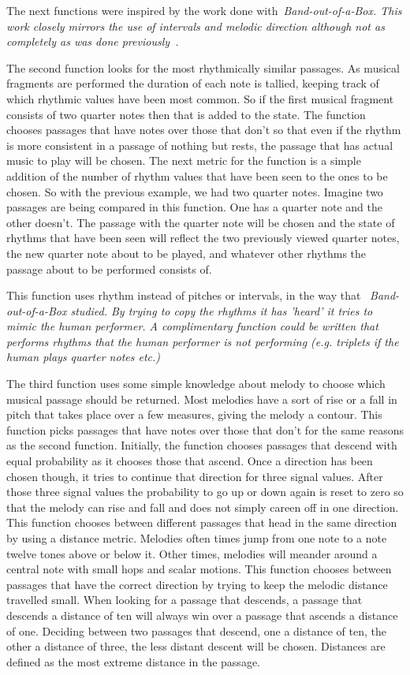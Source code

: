 \documentclass[12pt]{ucthesis}
\begin{document}
The next functions were inspired by the work done with~\em{Band-out-of-a-Box. }\em This work closely mirrors the use of intervals and melodic direction although not as completely as was done previously~\cite{bob}.

The second function looks for the most rhythmically similar passages. As musical fragments are performed the duration of each note is tallied, keeping track of which rhythmic values have been most common. So if the first musical fragment consists of two quarter notes then that is added to the state. The function chooses passages that have notes over those that don't so that even if the rhythm is more consistent in a passage of nothing but rests, the passage that has actual music to play will be chosen. The next metric for the function is a simple addition of the number of rhythm values that have been seen to the ones to be chosen. So with the previous example, we had two quarter notes. Imagine two passages are being compared in this function. One has a quarter note and the other doesn't. The passage with the quarter note will be chosen and the state of rhythms that have been seen will reflect the two previously viewed quarter notes, the new quarter note about to be played, and whatever other rhythms the passage about to be performed consists of.

This function uses rhythm instead of pitches or intervals, in the way that ~\em{Band-out-of-a-Box }\em studied. By trying to copy the rhythms it has 'heard' it tries to mimic the human performer. A complimentary function could be written that performs rhythms that the human performer is not performing (e.g. triplets if the human plays quarter notes etc.)

The third function uses some simple knowledge about melody to choose which musical passage should be returned. Most melodies have a sort of rise or a fall in pitch that takes place over a few measures, giving the melody a contour. This function picks passages that have notes over those that don't for the same reasons as the second function. Initially, the function chooses passages that descend with equal probability as it chooses those that ascend. Once a direction has been chosen though, it tries to continue that direction for three signal values. After those three signal values the probability to go up or down again is reset to zero so that the melody can rise and fall and does not simply careen off in one direction. This function chooses between different passages that head in the same direction by using a distance metric. Melodies often times jump from one note to a note twelve tones above or below it. Other times, melodies will meander around a central note with small hops and scalar motions. This function chooses between passages that have the correct direction by trying to keep the melodic distance travelled small. When looking for a passage that descends, a passage that descends a distance of ten will always win over a passage that ascends a distance of one. Deciding between two passages that descend, one a distance of ten, the other a distance of three, the less distant descent will be chosen. Distances are defined as the most extreme distance in the passage.
\end{document}
